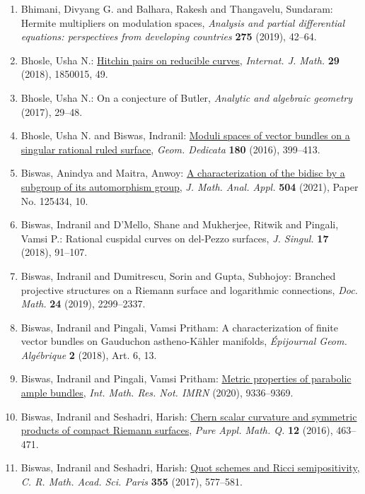 \begin{enumerate}
{interpolation and extension}, \emph{J. Funct. Anal.} {\bf 274} (2018), 504--524.
\item Bhimani, Divyang G. and Balhara, Rakesh and Thangavelu,
Sundaram: Hermite multipliers on modulation spaces, \emph{Analysis and partial differential equations: perspectives from
developing countries} {\bf 275} (2019), 42--64.
\item Bhosle, Usha N.: \href{https://doi.org/10.1142/S0129167X18500155}{Hitchin pairs on reducible curves}, \emph{Internat. J. Math.} {\bf 29} (2018), 1850015, 49.
\item Bhosle, Usha N.: On a conjecture of {B}utler, \emph{Analytic and algebraic geometry} {\bf } (2017), 29--48.
\item Bhosle, Usha N. and Biswas, Indranil: \href{https://doi.org/10.1007/s10711-015-0108-2}{Moduli spaces of vector bundles on a singular rational ruled
surface}, \emph{Geom. Dedicata} {\bf 180} (2016), 399--413.
\item Biswas, Anindya and Maitra, Anwoy: \href{https://doi.org/10.1016/j.jmaa.2021.125434}{A characterization of the bidisc by a subgroup of its
automorphism group}, \emph{J. Math. Anal. Appl.} {\bf 504} (2021), Paper No. 125434, 10.
\item Biswas, Indranil and D'Mello, Shane and Mukherjee, Ritwik and
Pingali, Vamsi P.: Rational cuspidal curves on del-{P}ezzo surfaces, \emph{J. Singul.} {\bf 17} (2018), 91--107.
\item Biswas, Indranil and Dumitrescu, Sorin and Gupta, Subhojoy: Branched projective structures on a {R}iemann surface and
logarithmic connections, \emph{Doc. Math.} {\bf 24} (2019), 2299--2337.
\item Biswas, Indranil and Pingali, Vamsi Pritham: A characterization of finite vector bundles on {G}auduchon
astheno-{K}\"{a}hler manifolds, \emph{\'{E}pijournal Geom. Alg\'{e}brique} {\bf 2} (2018), Art. 6, 13.
\item Biswas, Indranil and Pingali, Vamsi Pritham: \href{https://doi.org/10.1093/imrn/rny259}{Metric properties of parabolic ample bundles}, \emph{Int. Math. Res. Not. IMRN} {\bf } (2020), 9336--9369.
\item Biswas, Indranil and Seshadri, Harish: \href{https://doi.org/10.4310/PAMQ.2016.v12.n4.a1}{Chern scalar curvature and symmetric products of compact
{R}iemann surfaces}, \emph{Pure Appl. Math. Q.} {\bf 12} (2016), 463--471.
\item Biswas, Indranil and Seshadri, Harish: \href{https://doi.org/10.1016/j.crma.2017.03.012}{Quot schemes and {R}icci semipositivity}, \emph{C. R. Math. Acad. Sci. Paris} {\bf 355} (2017), 577--581.

\end{enumerate}
